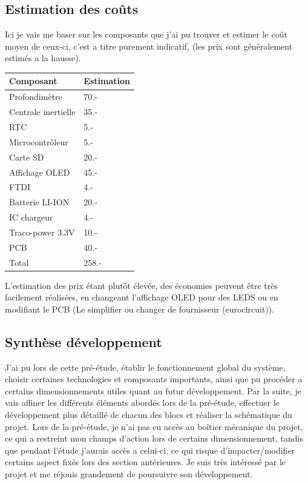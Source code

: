 \newpage
\subsection{Estimation des coûts} \label{ssec:EstPrix}
{
    Ici je vais me baser sur les composants que j'ai pu trouver et estimer le coût moyen de ceux-ci, c'est a titre purement indicatif, (les prix sont généralement estimés a la hausse).
    \vspace{+12pt}
    
    \begin{center}
        \begin{tabular}{l|l}
            Composant & Estimation \\
            \hline
            Profondimètre & 70.- \\
            Centrale inertielle & 35.- \\
            RTC & 5.- \\
            Microcontrôleur & 5.- \\
            Carte SD & 20.- \\
            Affichage OLED & 45.- \\
            FTDI & 4.- \\
            Batterie LI-ION & 20.- \\
            IC chargeur & 4.- \\
            Traco-power 3.3V & 10.- \\
            PCB & 40.- \\
            \hline
            \hline
            Total & 258.-
        \end{tabular} 
    \end{center}
	

    L'estimation des prix étant plutôt élevée, des économies peuvent être très facilement réalisées, en changeant l'affichage OLED pour des LEDS ou en modifiant le PCB (Le simplifier ou changer de fournisseur (eurocircuit)).

}

\subsection{Synthèse développement} \label{ssec:PreeConc}
{

J'ai pu lors de cette pré-étude, établir le fonctionnement global du système, choisir certaines technologies et composants importants, ainsi que pu procéder a certains dimensionnements utiles quant au futur développement. 
Par la suite, je vais affiner les différents éléments abordés lors de la pré-étude, effectuer le développement plus détaillé de chacun des blocs et réaliser la schématique du projet.
Lors de la pré-étude, je n'ai pas eu accès au boîtier mécanique du projet, ce qui a restreint mon champs d'action lors de certains dimensionnement, tandis que pendant l'étude j'aurais accès a celui-ci, ce qui risque d'impacter/modifier certains aspect fixés lors des section antérieures.
Je suis très intéressé par le projet et me réjouis grandement de poursuivre son développement.

}

\clearpage
